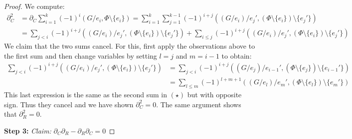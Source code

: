 \begin{proof}
	We compute:
	\begin{align*}
		\partial_{C}^2 &= \partial_{C} \sum_{i=1}^{k} (-1)^{i}(G / e_{i}, \Phi \setminus \{e_{i}\})
		=  \sum_{i=1}^{k} \sum_{j=1}^{k-1} (-1)^{i+j}((G / e_{i}) / e_{j}', (\Phi \setminus \{e_{i}\} ) \setminus \{e_{j}'\})  \\
					   &= \sum_{j < i} (-1)^{i+j} ((G / e_{i}) / e_{j}', (\Phi \setminus \{e_{i}\} ) \setminus \{e_{j}'\}) + \sum_{i \leq j} (-1)^{i+j}
					   ((G / e_{i}) / e_{j}', (\Phi \setminus \{e_{i}\} ) \setminus \{e_{j}'\}) \tag{$\star$}
	\end{align*}
	We claim that the two sums cancel. For this, first apply the observations above to the first sum and then change variables by setting $l = j$ and  $m = i-1$ to obtain:
	\begin{align*}
		\sum_{j < i} (-1)^{i+j} ((G / e_{i}) / e_{j}', (\Phi \setminus \{e_{i}\}) \setminus \{e_{j}'\} ) &= 
		\sum_{j < i} (-1)^{i+j}((G / e_{j}) / e_{i-1}', (\Phi \setminus \{e_{j}\}) \setminus \{e_{i-1}'\} ) \\ 
		&= \sum_{l \leq m} (-1)^{l+m+1} ((G / e_{l}) / e_{m}', (\Phi \setminus \{e_{l}\}) \setminus \{e_{m}'\} ) 
	\end{align*}
	This last expression is the same as the second sum in $(\star)$ but with opposite sign. Thus they cancel and we have shown $\partial_{C}^2 = 0$.
	The same argument shows that $\partial_{R}^2 = 0$.

	\textbf{Step 3:} \emph{Claim:} $\partial_{C} \partial_{R} - \partial_{R} \partial_{C} = 0$


\end{proof}
